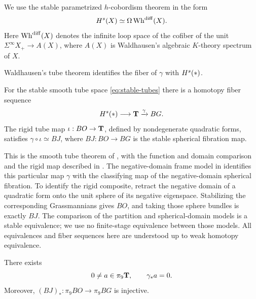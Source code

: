 We use the stable parametrized $h$-cobordism theorem
\cite[Theorems~0.1 and~0.3]{WJR2013} in the form
\begin{equation}\label{eq:stable-hcob-theorem}
 H^s(X)\simeq\Omega\operatorname{Wh}^{\mathrm{diff}}(X).
\end{equation}
Here
$\operatorname{Wh}^{\mathrm{diff}}(X)$ denotes the infinite loop space of the cofiber
of the unit $\Sigma^\infty X_+\to A(X)$, where $A(X)$ is Waldhausen's
algebraic $K$-theory spectrum of $X$.

Waldhausen's tube theorem identifies the fiber of $\gamma$ with
$H^s(*)$.

\begin{theorem}\label{thm:tube-fibration}
For the stable smooth tube space \eqref{eq:stable-tubes} there is a
homotopy fiber sequence
\begin{equation}\label{eq:tube-fibration}
 H^s(*)\longrightarrow\mathbf T\xrightarrow{\gamma}BG.
\end{equation}
The rigid tube map $\iota:BO\to\mathbf T$, defined by nondegenerate quadratic
forms, satisfies $\gamma\circ\iota\simeq BJ$, where
$BJ:BO\to BG$ is the stable spherical fibration map.
\end{theorem}

This is the smooth tube theorem of \cite{Waldhausen1982}, with the
function and domain comparison and the rigid map described in
\cite[\S3.6, Theorem~3.30 and Remark~3.34]{AIS2026}. The negative-domain
frame model in \cite[\S4.1, Definition~4.3, Propositions~4.4, 4.6, 4.7 and Remark~4.5]{AACK2025}
identifies this particular map $\gamma$ with the classifying map of the
negative-domain spherical fibration. To identify the rigid composite,
retract the negative domain of a quadratic form onto
the unit sphere of its negative eigenspace. Stabilizing the corresponding
Grassmannians gives $BO$, and taking those sphere bundles is exactly
$BJ$. The comparison of the partition and spherical-domain models
is a stable equivalence; we use no finite-stage equivalence between
those models. All equivalences and fiber sequences here are understood
up to weak homotopy equivalence.

\begin{proposition}\label{prop:kernel-class}
There exists
\begin{equation}\label{eq:kernel-class}
 0\ne a\in\pi_9\mathbf T,\qquad \gamma_*a=0.
\end{equation}
Moreover, $(BJ)_*:\pi_9BO\to\pi_9BG$ is injective.
\end{proposition}

